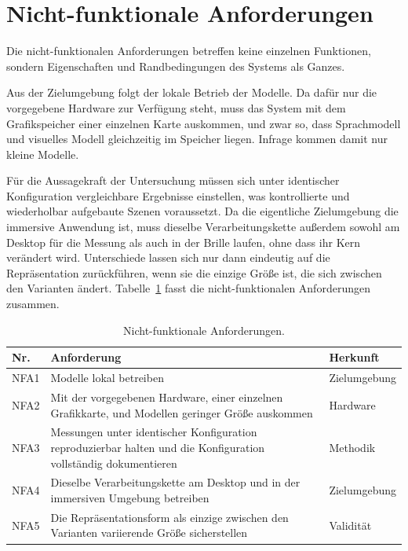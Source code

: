 \section{Nicht-funktionale Anforderungen}
\label{sec:anf-nichtfunktional}

Die nicht-funktionalen Anforderungen betreffen keine einzelnen Funktionen, sondern Eigenschaften und Randbedingungen des Systems als Ganzes.

Aus der Zielumgebung folgt der lokale Betrieb der Modelle.
Da dafür nur die vorgegebene Hardware zur Verfügung steht, muss das System mit dem Grafikspeicher einer einzelnen Karte auskommen, und zwar so, dass Sprachmodell und visuelles Modell gleichzeitig im Speicher liegen.
Infrage kommen damit nur kleine Modelle.

Für die Aussagekraft der Untersuchung müssen sich unter identischer Konfiguration vergleichbare Ergebnisse einstellen, was kontrollierte und wiederholbar aufgebaute Szenen voraussetzt.
Da die eigentliche Zielumgebung die immersive Anwendung ist, muss dieselbe Verarbeitungskette außerdem sowohl am Desktop für die Messung als auch in der Brille laufen, ohne dass ihr Kern verändert wird.
Unterschiede lassen sich nur dann eindeutig auf die Repräsentation zurückführen, wenn sie die einzige Größe ist, die sich zwischen den Varianten ändert.
Tabelle~\ref{tab:nfa} fasst die nicht-funktionalen Anforderungen zusammen.

\begin{table}[htbp]
  \centering
  \caption{Nicht-funktionale Anforderungen.}
  \label{tab:nfa}
  \small
  \setlength{\tabcolsep}{5pt}
  \renewcommand{\arraystretch}{1.3}
  \begin{tabular}{@{}l p{9.4cm} l@{}}
    \toprule
    Nr. & Anforderung & Herkunft \\
    \midrule
    NFA1 & Modelle lokal betreiben & Zielumgebung \\
    NFA2 & Mit der vorgegebenen Hardware, einer einzelnen Grafikkarte, und Modellen geringer Größe auskommen & Hardware \\
    NFA3 & Messungen unter identischer Konfiguration reproduzierbar halten und die Konfiguration vollständig dokumentieren & Methodik \\
    NFA4 & Dieselbe Verarbeitungskette am Desktop und in der immersiven Umgebung betreiben & Zielumgebung \\
    NFA5 & Die Repräsentationsform als einzige zwischen den Varianten variierende Größe sicherstellen & Validität \\
    \bottomrule
  \end{tabular}
\end{table}

